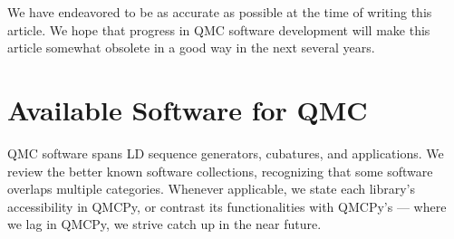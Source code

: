 \documentclass[graybox,footinfo]{svmult}
\begin{document}
We have endeavored to be as accurate as possible at the time of writing this article.  We hope that progress in QMC software development will make this article somewhat obsolete in a good way in the next several years.

\section{Available Software for QMC} \label{sec:available} 
QMC software spans  LD sequence generators, cubatures, and applications.  We review the better known software collections, recognizing that some software overlaps multiple categories. Whenever applicable, we state each library's accessibility in QMCPy, or contrast its functionalities with QMCPy's --- where we lag in QMCPy, we strive catch up in the near future.
\end{document}
